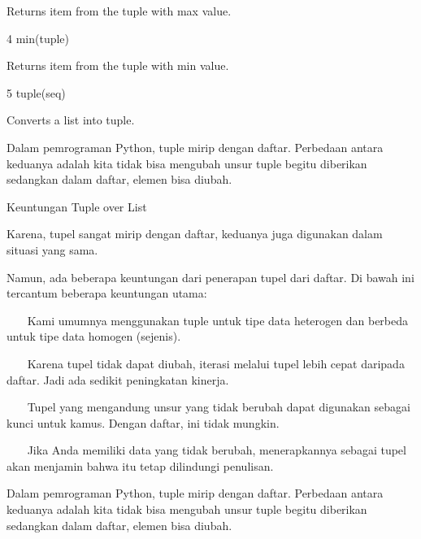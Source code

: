 \vspace{12pt}
Returns item from the tuple with max value. \par
4 \hspace*{0.5in} min(tuple) \par
\vspace{12pt}
Returns item from the tuple with min value. \par
5 \hspace*{0.5in} tuple(seq) \par
\vspace{12pt}
Converts a list into tuple. \par
\vspace{12pt}
\vspace{12pt}
\vspace{12pt}
\vspace{12pt}
\vspace{12pt}
Dalam pemrograman Python, tuple mirip dengan daftar. Perbedaan antara keduanya adalah kita tidak bisa mengubah unsur tuple begitu diberikan sedangkan dalam daftar, elemen bisa diubah. \par
Keuntungan Tuple over List \par
\vspace{12pt}
Karena, tupel sangat mirip dengan daftar, keduanya juga digunakan dalam situasi yang sama. \par
\vspace{12pt}
Namun, ada beberapa keuntungan dari penerapan tupel dari daftar. Di bawah ini tercantum beberapa keuntungan utama: \par
\vspace{12pt}
~~~ Kami umumnya menggunakan tuple untuk tipe data heterogen dan berbeda untuk tipe data homogen (sejenis). \par
~~~ Karena tupel tidak dapat diubah, iterasi melalui tupel lebih cepat daripada daftar. Jadi ada sedikit peningkatan kinerja. \par
~~~ Tupel yang mengandung unsur yang tidak berubah dapat digunakan sebagai kunci untuk kamus. Dengan daftar, ini tidak mungkin. \par
~~~ Jika Anda memiliki data yang tidak berubah, menerapkannya sebagai tupel akan menjamin bahwa itu tetap dilindungi penulisan. \par
\vspace{12pt}
Dalam pemrograman Python, tuple mirip dengan daftar. Perbedaan antara keduanya adalah kita tidak bisa mengubah unsur tuple begitu diberikan sedangkan dalam daftar, elemen bisa diubah. \par
